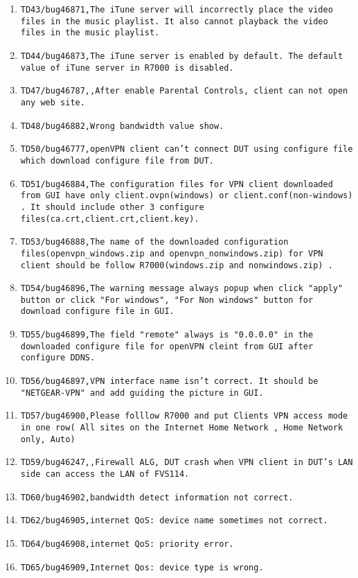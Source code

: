 \documentclass[12pt]{report}
\begin{document}
\begin{itemize}
\begin{enumerate}
		\item \texttt{TD43/bug46871,The iTune server will incorrectly place the video files in the music playlist. It also cannot playback the video files in the music playlist.}
		\item \texttt{TD44/bug46873,The iTune server is enabled by default. The default value of iTune server in R7000 is disabled.}
		\item \texttt{TD47/bug46787,,After enable Parental Controls, client can not open any web site.}
		\item \texttt{TD48/bug46882,Wrong bandwidth value show.}
		\item \texttt{TD50/bug46777,openVPN client  can't connect DUT using configure file which download configure file from DUT.}
		\item \texttt{TD51/bug46884,The configuration files for VPN client downloaded from GUI  have only client.ovpn(windows) or client.conf(non-windows) . It should include other 3 configure files(ca.crt,client.crt,client.key).}
		\item \texttt{TD53/bug46888,The name of the downloaded configuration files(openvpn\_windows.zip and openvpn\_nonwindows.zip) for VPN client  should be follow R7000(windows.zip and nonwindows.zip) .}
		\item \texttt{TD54/bug46896,The warning message always popup when click "apply" button or click "For windows", "For Non windows" button for download configure file in GUI.}
		\item \texttt{TD55/bug46899,The field "remote" always is "0.0.0.0" in the downloaded configure file for openVPN cleint from GUI after configure DDNS.}
		\item \texttt{TD56/bug46897,VPN interface name isn't correct. It should be "NETGEAR-VPN" and add guiding  the picture in GUI.}
		\item \texttt{TD57/bug46900,Please folllow R7000 and put Clients VPN access mode in one row( All sites on the Internet Home Network , Home Network only, Auto)}
		\item \texttt{TD59/bug46247,,Firewall ALG, DUT crash when  VPN client in DUT's LAN side can access the LAN of FVS114.}
		\item \texttt{TD60/bug46902,bandwidth detect information not correct.}
		\item \texttt{TD62/bug46905,internet QoS: device name  sometimes not correct.}
		\item \texttt{TD64/bug46908,internet QoS: priority error.}
		\item \texttt{TD65/bug46909,Internet Qos: device type is wrong.}

\end{enumerate}
\end{itemize}
\end{document}
